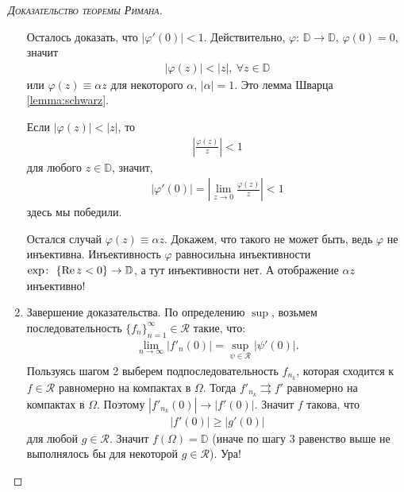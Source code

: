 \documentclass[../complex-analysis.tex]{subfiles}
\begin{document}
\begin{proof}[\normalfont\textsc{Доказательство теоремы Римана}]
\begin{enumerate}
   Осталось доказать, что $ \left| \varphi'(0) \right| < 1 $. Действительно, $ \varphi\colon\,\mathbb D \to \mathbb D $, $ \varphi(0) = 0 $, значит
   \begin{align*}
    \left| \varphi(z) \right| < \left| z \right|, \ \forall z \in \mathbb D
   \end{align*} или $ \varphi(z) \equiv \alpha z $ для некоторого $ \alpha $, $ \left| \alpha \right| = 1 $. Это лемма Шварца \eqref{lemma:schwarz}.

   Если $ \left| \varphi(z) \right| < \left| z \right| $, то
   \begin{align*}
    \left| \frac{\varphi(z)}{z} \right| < 1
   \end{align*} 
   для любого $ z \in \mathbb D $, 
   значит,
   \begin{align*}
    |\varphi'(0)| = \left| \lim_{z \to 0} \frac{\varphi(z)}{z} \right| < 1
   \end{align*} здесь мы победили.

   Остался случай $ \varphi(z) \equiv \alpha z $. Докажем, что такого не может быть, ведь $ \varphi $ не инъективна. Инъективность $ \varphi $ равносильна инъективности $ \exp \colon\, \left\{ \operatorname{Re} z < 0 \right\} \to \mathbb D $, а тут инъективности нет. А отображение $ \alpha z $ инъективно!

  \item Завершение доказательства.
   По определению $\sup$, возьмем последовательность $ \{ f_n \}^\infty_{n=1} \in \mathcal R $ такие, что:
   \begin{align*}
    \lim_{n \to \infty} \left| f'_n(0) \right| = \sup_{\psi \in \mathcal R} \left| \psi'(0) \right|.
   \end{align*} 
   Пользуясь шагом 2 выберем подпоследовательность $ f_{n_k} $, которая сходится к $ f \in \mathcal R $ равномерно на компактах в $ \Omega $. Тогда $ f'_{n_k} \rightrightarrows f' $ равномерно на компактах в $ \Omega $. Поэтому $ \left| f'_{n_k}(0) \right| \to \left| f'(0) \right| $. Значит $ f $ такова, что
   \begin{align*}
    \left| f'(0) \right| \geqslant \left| g'(0) \right|
   \end{align*} для любой $ g \in \mathcal R $. Значит $ f(\Omega) = \mathbb D $ (иначе по шагу 3 равенство выше не выполнялось бы для некоторой $ g \in \mathcal R $). Ура!
 \end{enumerate}
\end{proof}
\end{document}
